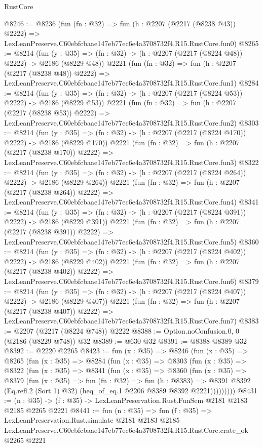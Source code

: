 \begin{lexlean}{RustCore}
\begin{coremodule}
@8246 := @8236
    (fun (fn : @32) =>
    fun (h : @2207 (@2217 (@8238 @43)) @2222) =>
    LexLeanPreserve.C60ebfcbaae147eb77ec6e4a3708732f4.R15.RustCore.fun0)
@8265 := @8214
    (fun (y : @35) => (fn : @32) -> (h : @2207 (@2217 (@8224 @48)) @2222) -> @2186 (@8229 @48))
    @2221
    (fun (fn : @32) =>
    fun (h : @2207 (@2217 (@8238 @48)) @2222) =>
    LexLeanPreserve.C60ebfcbaae147eb77ec6e4a3708732f4.R15.RustCore.fun1)
@8284 := @8214
    (fun (y : @35) => (fn : @32) -> (h : @2207 (@2217 (@8224 @53)) @2222) -> @2186 (@8229 @53))
    @2221
    (fun (fn : @32) =>
    fun (h : @2207 (@2217 (@8238 @53)) @2222) =>
    LexLeanPreserve.C60ebfcbaae147eb77ec6e4a3708732f4.R15.RustCore.fun2)
@8303 := @8214
    (fun (y : @35) => (fn : @32) -> (h : @2207 (@2217 (@8224 @170)) @2222) -> @2186 (@8229 @170))
    @2221
    (fun (fn : @32) =>
    fun (h : @2207 (@2217 (@8238 @170)) @2222) =>
    LexLeanPreserve.C60ebfcbaae147eb77ec6e4a3708732f4.R15.RustCore.fun3)
@8322 := @8214
    (fun (y : @35) => (fn : @32) -> (h : @2207 (@2217 (@8224 @264)) @2222) -> @2186 (@8229 @264))
    @2221
    (fun (fn : @32) =>
    fun (h : @2207 (@2217 (@8238 @264)) @2222) =>
    LexLeanPreserve.C60ebfcbaae147eb77ec6e4a3708732f4.R15.RustCore.fun4)
@8341 := @8214
    (fun (y : @35) => (fn : @32) -> (h : @2207 (@2217 (@8224 @391)) @2222) -> @2186 (@8229 @391))
    @2221
    (fun (fn : @32) =>
    fun (h : @2207 (@2217 (@8238 @391)) @2222) =>
    LexLeanPreserve.C60ebfcbaae147eb77ec6e4a3708732f4.R15.RustCore.fun5)
@8360 := @8214
    (fun (y : @35) => (fn : @32) -> (h : @2207 (@2217 (@8224 @402)) @2222) -> @2186 (@8229 @402))
    @2221
    (fun (fn : @32) =>
    fun (h : @2207 (@2217 (@8238 @402)) @2222) =>
    LexLeanPreserve.C60ebfcbaae147eb77ec6e4a3708732f4.R15.RustCore.fun6)
@8379 := @8214
    (fun (y : @35) => (fn : @32) -> (h : @2207 (@2217 (@8224 @407)) @2222) -> @2186 (@8229 @407))
    @2221
    (fun (fn : @32) =>
    fun (h : @2207 (@2217 (@8238 @407)) @2222) =>
    LexLeanPreserve.C60ebfcbaae147eb77ec6e4a3708732f4.R15.RustCore.fun7)
@8383 := @2207 (@2217 (@8224 @748)) @2222
@8388 := Option.noConfusion.{0, 0} (@2186 (@8229 @748)) @32
@8389 := @630 @32
@8391 := @8388 @8389 @32
@8392 := @2220 @2265
@8423 := fun (x : @35) =>
  @8246
    (fun (x : @35) =>
    @8265
      (fun (x : @35) =>
      @8284
        (fun (x : @35) =>
        @8303
          (fun (x : @35) =>
          @8322
            (fun (x : @35) =>
            @8341
              (fun (x : @35) =>
              @8360
                (fun (x : @35) =>
                @8379
                  (fun (x : @35) =>
                  fun (fn : @32) =>
                  fun (h : @8383) =>
                  @8391
                    @8392
                    (Eq.refl.{2} (Sort 1) @32)
                    (heq_of_eq.{1} @2206 @8389 @8392 @2221)))))))))
@8431 := (n : @35) -> (f : @35) -> LexLeanPreservation.Rust.FunSem @2181 @2183 @2185 @2265 @2221
@8441 := fun (n : @35) =>
  fun (f : @35) =>
  LexLeanPreservation.Rust.simulate
    @2181
    @2183
    @2185
    LexLeanPreserve.C60ebfcbaae147eb77ec6e4a3708732f4.R15.RustCore.crate_ok
    @2265
    @2221
\end{coremodule}
\end{lexlean}
